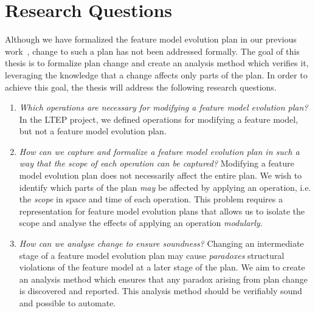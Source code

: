 
\section{Research Questions}
\label{sec:research-questions}
Although we have formalized the feature model evolution plan in our previous work~\cite{art:consistency-preserving-evolution-planning}, change to such a plan has not been addressed formally. 
The goal of this thesis is to formalize plan change and create an analysis method which verifies it, leveraging the knowledge that a change affects only parts of the plan.
In order to achieve this goal, the thesis will address the following research questions.

\begin{enumerate}[\itbf{RQ\arabic*}, itemsep=0mm]
   \item \textit{Which operations are necessary for modifying a feature model evolution plan?} In the LTEP project, we defined operations for modifying a feature model, but not a feature model evolution plan. \label{rq1}
   \item \textit{How can we capture and formalize a feature model evolution plan in such a way that the scope of each operation can be captured?} Modifying a feature model evolution plan does not necessarily affect the entire plan. We wish to identify which parts of the plan \emph{may} be affected by applying an operation, i.e. the \emph{scope} in space and time of each operation. This problem requires a representation for feature model evolution plans that allows us to isolate the scope and analyse the effects of applying an operation \emph{modularly}.  \label{rq2}
   \item \textit{How can we analyse change to ensure soundness?} 
      Changing an intermediate stage of a feature model evolution plan may cause \emph{paradoxes} \textemdash{} structural violations of the feature model \textemdash{} at a later stage of the plan. 
      We aim to create an analysis method which ensures that any paradox arising from plan change is discovered and reported. This analysis method should be verifiably sound and possible to automate. \label{rq3}
\end{enumerate}

